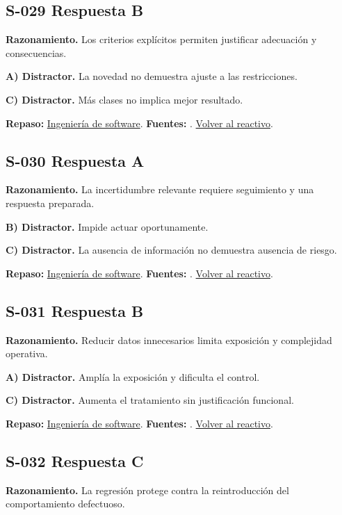 \subsection*{S-029 \quad Respuesta B}\label{s:S-029}
\textbf{Razonamiento.} Los criterios explícitos permiten justificar adecuación y consecuencias.

\textbf{A) Distractor. }La novedad no demuestra ajuste a las restricciones.

\textbf{C) Distractor. }Más clases no implica mejor resultado.

\textbf{Repaso:} \hyperref[sec:s1]{Ingeniería de software}. \textbf{Fuentes:} \cite{scrum,swebok}. \hyperref[q:S-029]{Volver al reactivo}.\par\medskip

\subsection*{S-030 \quad Respuesta A}\label{s:S-030}
\textbf{Razonamiento.} La incertidumbre relevante requiere seguimiento y una respuesta preparada.

\textbf{B) Distractor. }Impide actuar oportunamente.

\textbf{C) Distractor. }La ausencia de información no demuestra ausencia de riesgo.

\textbf{Repaso:} \hyperref[sec:s1]{Ingeniería de software}. \textbf{Fuentes:} \cite{scrum,swebok}. \hyperref[q:S-030]{Volver al reactivo}.\par\medskip

\subsection*{S-031 \quad Respuesta B}\label{s:S-031}
\textbf{Razonamiento.} Reducir datos innecesarios limita exposición y complejidad operativa.

\textbf{A) Distractor. }Amplía la exposición y dificulta el control.

\textbf{C) Distractor. }Aumenta el tratamiento sin justificación funcional.

\textbf{Repaso:} \hyperref[sec:s1]{Ingeniería de software}. \textbf{Fuentes:} \cite{scrum,swebok}. \hyperref[q:S-031]{Volver al reactivo}.\par\medskip

\subsection*{S-032 \quad Respuesta C}\label{s:S-032}
\textbf{Razonamiento.} La regresión protege contra la reintroducción del comportamiento defectuoso.

